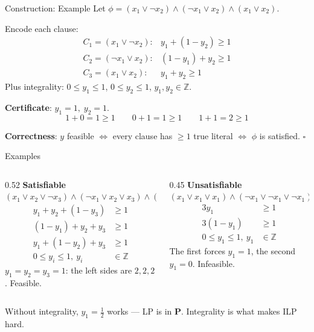 \documentclass[10pt,aspectratio=169]{beamer}
\begin{document}
\begin{frame}{Construction: Example}
  Let $\phi = (x_1 \lor \neg x_2) \land (\neg x_1 \lor x_2) \land
              (x_1 \lor x_2)$.

  \bigskip
  Encode each clause:
  \[
    \begin{array}{ll}
      C_1 = (x_1 \lor \neg x_2): & y_1 + (1 - y_2) \ge 1 \\[4pt]
      C_2 = (\neg x_1 \lor x_2): & (1 - y_1) + y_2 \ge 1 \\[4pt]
      C_3 = (x_1 \lor x_2):      & y_1 + y_2 \ge 1
    \end{array}
  \]
  Plus integrality: $0 \le y_1 \le 1$,\; $0 \le y_2 \le 1$,\;
  $y_1, y_2 \in \mathbb{Z}$.

  \pause
  \bigskip
  \textbf{Certificate}: $y_1 = 1,\; y_2 = 1$.
  \[
    1 + 0 = 1 \ge 1 \qquad
    0 + 1 = 1 \ge 1 \qquad
    1 + 1 = 2 \ge 1
  \]

  \medskip
  \textbf{Correctness}: $y$ feasible $\iff$ every clause has $\ge 1$ true
  literal $\iff$ $\phi$ is satisfied. \hfill $\square$
\end{frame}

\begin{frame}{Examples}
  \begin{columns}[t]
    \begin{column}{0.52\textwidth}
      \textbf{Satisfiable}\\[2pt]
      \small
      $(x_1 \lor x_2 \lor \neg x_3) \land (\neg x_1 \lor x_2 \lor x_3)
       \land (x_1 \lor \neg x_2 \lor x_3)$
      \[
        \begin{aligned}
          y_1 + y_2 + (1 - y_3) &\ge 1 \\
          (1 - y_1) + y_2 + y_3 &\ge 1 \\
          y_1 + (1 - y_2) + y_3 &\ge 1 \\
          0 \le y_i \le 1, \ y_i &\in \mathbb{Z}
        \end{aligned}
      \]
      $y_1 = y_2 = y_3 = 1$: the left sides are $2, 2, 2$. Feasible.
    \end{column}
    \begin{column}{0.45\textwidth}
      \textbf{Unsatisfiable}\\[2pt]
      \small
      $(x_1 \lor x_1 \lor x_1) \land (\neg x_1 \lor \neg x_1 \lor \neg x_1)$
      \[
        \begin{aligned}
          3 y_1 &\ge 1 \\
          3 (1 - y_1) &\ge 1 \\
          0 \le y_1 \le 1, \ y_1 &\in \mathbb{Z}
        \end{aligned}
      \]
      The first forces $y_1 = 1$, the second $y_1 = 0$. Infeasible.
    \end{column}
  \end{columns}

  \bigskip
  \small Without integrality, $y_1 = \tfrac{1}{2}$ works — LP is in
  $\mathbf{P}$. Integrality is what makes ILP hard.
\end{frame}
\end{document}
